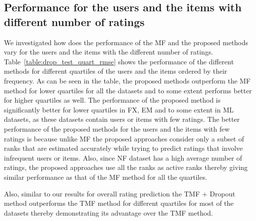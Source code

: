 \subsection{Performance for the users and the items with different number of
ratings}
We investigated how does the performance of the MF and the proposed methods vary
for the users and the items with the different number of ratings.
Table~\ref{table:drop_test_quart_rmse} shows
the performance of the different methods for different quartiles of the users
and the items ordered by their frequency. As can be seen in the table, the
proposed methods outperform the MF method for lower quartiles for
all the datasets and to some extent performs better for higher quartiles as
well.
The performance of the proposed method is significantly better for lower
quartiles in FX, EM and to some extent in ML datasets, as these datasets contain users or
items with few ratings.
The better performance of the proposed methods for the users and the items 
with few ratings is because unlike MF the proposed approaches consider only
a subset of ranks that are estimated accurately while trying to predict
ratings that involve infrequent users or items.
Also, since NF dataset has a high average number of ratings, the proposed
approaches use all the ranks as active ranks thereby giving similar performance 
as that of the MF method for all the quartiles.


Also, similar to our results for overall rating prediction the  TMF +
Dropout method outperforms the TMF method for different quartiles for most of the
datasets thereby demonstrating its advantage over the TMF method.


